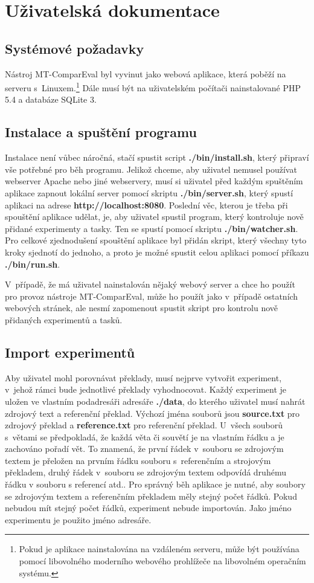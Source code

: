 \chapter{Uživatelská dokumentace}
\label{chap:users}

\section{Systémové požadavky}
Nástroj \mbox{MT-ComparEval} byl vyvinut jako webová aplikace,
  která poběží na serveru s~Linuxem.\footnote{
    Pokud je aplikace nainstalována na vzdáleném serveru, může být používána pomocí libovolného moderního webového prohlížeče na libovolném operačním systému.
  }
Dále musí být na uživatelském počítači nainstalované PHP 5.4 a databáze SQLite 3.

\section{Instalace a spuštění programu}
Instalace není vůbec náročná,
  stačí spustit script \textbf{./bin/install.sh},
  který připraví vše potřebné pro běh programu. 
Jelikož chceme,
  aby uživatel nemusel používat webserver Apache nebo jiné webservery,
  musí si uživatel před každým spuštěním aplikace zapnout lokální server pomocí skriptu \textbf{./bin/server.sh},
  který spustí aplikaci na adrese \textbf{http://localhost:8080}.
Poslední věc,
  kterou je třeba při spouštění aplikace udělat, je,
  aby uživatel spustil program,
  který kontroluje nově přidané experimenty a tasky.
Ten se spustí pomocí skriptu \textbf{./bin/watcher.sh}.
Pro celkové zjednodušení spouštění aplikace byl přidán skript,
  který všechny tyto kroky sjednotí do jednoho,
  a proto je možné spustit celou aplikaci pomocí příkazu \textbf{./bin/run.sh}.

V~případě, že má uživatel nainstalován nějaký webový server
  a chce ho použít pro provoz nástroje \mbox{MT-ComparEval},
  může ho použít jako v~případě ostatních webových stránek,
  ale nesmí zapomenout spustit skript pro kontrolu nově přidaných experimentů a tasků.

\section{Import experimentů}
Aby uživatel mohl porovnávat překlady,
  musí nejprve vytvořit experiment,
  v~jehož rámci bude jednotlivé překlady vyhodnocovat.
Každý experiment je uložen ve vlastním podadresáři adresáře \textbf{./data},
  do kterého uživatel musí nahrát zdrojový text a referenční překlad.
Výchozí jména souborů jsou \textbf{source.txt} pro zdrojový překlad
  a \textbf{reference.txt} pro referenční překlad.
U~všech souborů s~větami se předpokladá,
  že každá věta či souvětí je na vlastním řádku
  a je zachováno pořadí vět.
To znamená, že první řádek v~souboru se zdrojovým textem je přeložen na prvním řádku souboru s~referenčním a strojovým překladem,
  druhý řádek v~souboru se zdrojovým textem odpovídá druhému řádku v souboru s referencí atd..
Pro správný běh aplikace je nutné, aby soubory se zdrojovým textem a referenčním překladem měly stejný počet řádků.
Pokud nebudou mít stejný počet řádků, experiment nebude importován.
Jako jméno experimentu je použito jméno adresáře.

